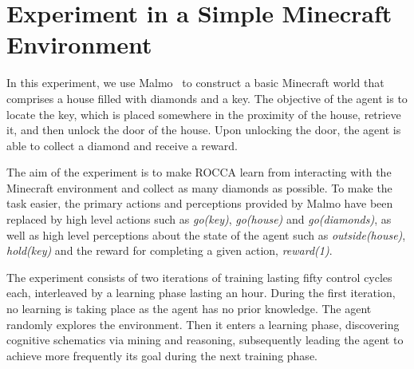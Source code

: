 \documentclass[runningheads]{llncs}
\begin{document}
\section{Experiment in a Simple Minecraft Environment}
\label{sec:minecraft}
In this experiment, we use Malmo~\cite{Johnson2016} to construct a
basic Minecraft world that comprises a house filled with diamonds and
a key. The objective of the agent is to locate the key, which is
placed somewhere in the proximity of the house, retrieve it, and then
unlock the door of the house. Upon unlocking the door, the agent is
able to collect a diamond and receive a reward. \par
The aim of the experiment is to make ROCCA learn from interacting
with the Minecraft environment
and collect as many diamonds as possible.
To make the task easier, the primary actions and perceptions provided
by Malmo have been replaced by high level actions
such as \textit{go(key)}, \textit{go(house)} and
\textit{go(diamonds)}, as well as high level perceptions about the
state of the agent such as \textit{outside(house)}, \textit{hold(key)}
and the reward for completing a given action, \textit{reward(1)}. \par
The experiment consists of two iterations of training lasting fifty
control cycles each, interleaved by a learning phase lasting an
hour. During the first iteration, no learning is taking place as the
agent has no prior knowledge. The agent randomly explores the
environment. Then it enters a learning phase, discovering cognitive
schematics via mining and reasoning, subsequently leading the agent to
achieve more frequently its goal during the next training phase.

\end{document}

